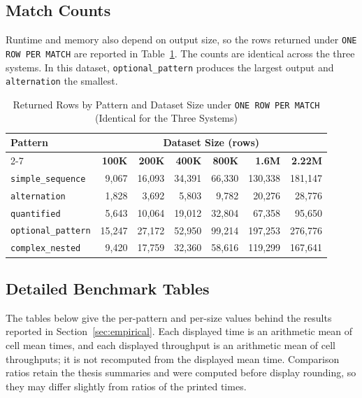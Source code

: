 \documentclass[preprint,12pt,times,a4paper]{elsarticle}
\begin{document}
\subsection{Match Counts}
\label{app:match-counts}

Runtime and memory also depend on output size, so the rows returned under
\texttt{ONE ROW PER MATCH} are reported in Table~\ref{tab:match_counts}. The
counts are identical across the three systems. In this dataset,
\texttt{optional\_pattern} produces the largest output and
\texttt{alternation} the smallest.

\begin{table}[t]
\centering\small

\begin{tabular}{@{\extracolsep{\fill}}lrrrrrr}
\toprule
\textbf{Pattern} & \multicolumn{6}{c}{\textbf{Dataset Size (rows)}} \\
\cmidrule(lr){2-7}
 & \textbf{100K} & \textbf{200K} & \textbf{400K} & \textbf{800K} & \textbf{1.6M} & \textbf{2.22M} \\
\midrule
\texttt{simple\_sequence} & 9,067 & 16,093 & 34,391 & 66,330 & 130,338 & 181,147 \\
\texttt{alternation} & 1,828 & 3,692 & 5,803 & 9,782 & 20,276 & 28,776 \\
\texttt{quantified} & 5,643 & 10,064 & 19,012 & 32,804 & 67,358 & 95,650 \\
\texttt{optional\_pattern} & 15,247 & 27,172 & 52,950 & 99,214 & 197,253 & 276,776 \\
\texttt{complex\_nested} & 9,420 & 17,759 & 32,360 & 58,616 & 119,299 & 167,641 \\
\bottomrule
\end{tabular}
\caption{Returned Rows by Pattern and Dataset Size under \texttt{ONE ROW PER MATCH} (Identical for the Three Systems)}
\label{tab:match_counts}
\end{table}

\subsection{Detailed Benchmark Tables}
\label{app:benchmark-tables}

The tables below give the per-pattern and per-size values behind the
results reported in Section~\ref{sec:empirical}. Each displayed time is an
arithmetic mean of cell mean times, and each displayed throughput is an
arithmetic mean of cell throughputs; it is not recomputed from the displayed
mean time. Comparison ratios retain the thesis summaries and were computed
before display rounding, so they may differ slightly from ratios of the printed
times.
\end{document}
